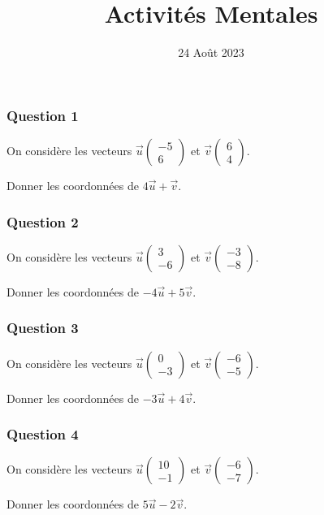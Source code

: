 \documentclass[15pt, mathserif]{beamer}
\title{Activités Mentales}
\date{24 Août 2023}
\begin{document}
\begin{frame}
    \titlepage
\end{frame}

\begin{frame} 
	\frametitle{Question 1}
On considère les vecteurs $\vec{u} \begin{pmatrix} -5 \\ 6 \end{pmatrix}$ et $\vec{v} \begin{pmatrix} 6 \\ 4 \end{pmatrix}$. 
 
 Donner les coordonnées de $4\vec{u}+\vec{v}$.\end{frame}


\begin{frame} 
	\frametitle{Question 2}
On considère les vecteurs $\vec{u} \begin{pmatrix} 3 \\ -6 \end{pmatrix}$ et $\vec{v} \begin{pmatrix} -3 \\ -8 \end{pmatrix}$. 
 
 Donner les coordonnées de $-4\vec{u}+5\vec{v}$.\end{frame}


\begin{frame} 
	\frametitle{Question 3}
On considère les vecteurs $\vec{u} \begin{pmatrix} 0 \\ -3 \end{pmatrix}$ et $\vec{v} \begin{pmatrix} -6 \\ -5 \end{pmatrix}$. 
 
 Donner les coordonnées de $-3\vec{u}+4\vec{v}$.\end{frame}


\begin{frame} 
	\frametitle{Question 4}
On considère les vecteurs $\vec{u} \begin{pmatrix} 10 \\ -1 \end{pmatrix}$ et $\vec{v} \begin{pmatrix} -6 \\ -7 \end{pmatrix}$. 
 
 Donner les coordonnées de $5\vec{u}-2\vec{v}$.\end{frame}
\end{document}
